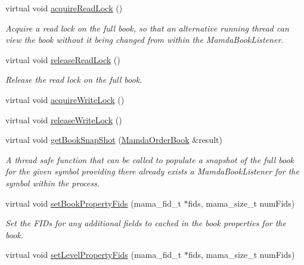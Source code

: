 \begin{CompactItemize}
virtual void \hyperlink{classWombat_1_1MamdaOrderBookListener_c049e9bab85f8db59adafeddee15e23e}{acquire\-Read\-Lock} ()
\begin{CompactList}\small\item\em Acquire a read lock on the full book, so that an alternative running thread can view the book without it being changed from within the Mamda\-Book\-Listener. \item\end{CompactList}\item 
virtual void \hyperlink{classWombat_1_1MamdaOrderBookListener_c227fabc3c91c6dbef8a6e338a023858}{release\-Read\-Lock} ()
\begin{CompactList}\small\item\em Release the read lock on the full book. \item\end{CompactList}\item 
virtual void \hyperlink{classWombat_1_1MamdaOrderBookListener_601244fd9fd694d64dc54a568e8f5b06}{acquire\-Write\-Lock} ()
\item 
virtual void \hyperlink{classWombat_1_1MamdaOrderBookListener_184fb4af88e62c4d77fb54f52ac3bcb8}{release\-Write\-Lock} ()
\item 
virtual void \hyperlink{classWombat_1_1MamdaOrderBookListener_da7f0348273e2877d9a27ae48406a59a}{get\-Book\-Snap\-Shot} (\hyperlink{classWombat_1_1MamdaOrderBook}{Mamda\-Order\-Book} \&result)
\begin{CompactList}\small\item\em A thread safe function that can be called to populate a snapshot of the full book for the given symbol providing there already exists a Mamda\-Book\-Listener for the symbol within the process. \item\end{CompactList}\item 
virtual void \hyperlink{classWombat_1_1MamdaOrderBookListener_a2ed42c47a443eb5f65189cfa498b9e3}{set\-Book\-Property\-Fids} (mama\_\-fid\_\-t $\ast$fids, mama\_\-size\_\-t num\-Fids)
\begin{CompactList}\small\item\em Set the FIDs for any additional fields to cached in the book properties for the book. \item\end{CompactList}\item 
virtual void \hyperlink{classWombat_1_1MamdaOrderBookListener_906cf0d645735a81be277fa4db1d1aaa}{set\-Level\-Property\-Fids} (mama\_\-fid\_\-t $\ast$fids, mama\_\-size\_\-t num\-Fids)

\end{CompactItemize}
